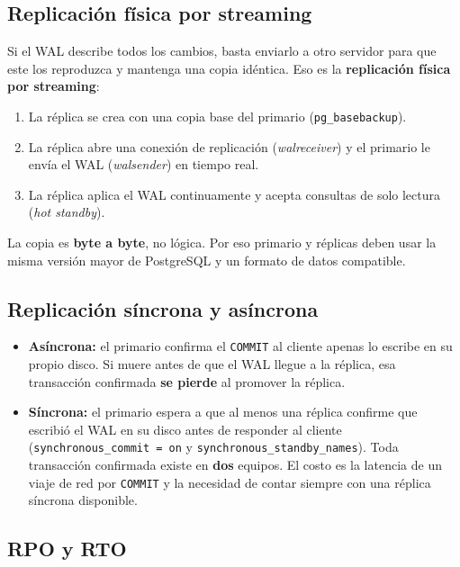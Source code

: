 \documentclass[11pt,a4paper]{article}
\newcommand{\cod}[1]{\texttt{#1}}
\begin{document}
\subsection{Replicación física por streaming}

Si el WAL describe todos los cambios, basta enviarlo a otro servidor para que este los reproduzca y mantenga una copia idéntica. Eso es la \textbf{replicación física por streaming}:

\begin{enumerate}
  \item La réplica se crea con una copia base del primario (\cod{pg\_basebackup}).
  \item La réplica abre una conexión de replicación (\emph{walreceiver}) y el primario le envía el WAL (\emph{walsender}) en tiempo real.
  \item La réplica aplica el WAL continuamente y acepta consultas de solo lectura (\emph{hot standby}).
\end{enumerate}

La copia es \textbf{byte a byte}, no lógica. Por eso primario y réplicas deben usar la misma versión mayor de PostgreSQL y un formato de datos compatible.

\subsection{Replicación síncrona y asíncrona}

\begin{itemize}
  \item \textbf{Asíncrona:} el primario confirma el \cod{COMMIT} al cliente apenas lo escribe en su propio disco. Si muere antes de que el WAL llegue a la réplica, esa transacción confirmada \textbf{se pierde} al promover la réplica.
  \item \textbf{Síncrona:} el primario espera a que al menos una réplica confirme que escribió el WAL en su disco antes de responder al cliente (\cod{synchronous\_commit = on} y \cod{synchronous\_standby\_names}). Toda transacción confirmada existe en \textbf{dos} equipos. El costo es la latencia de un viaje de red por \cod{COMMIT} y la necesidad de contar siempre con una réplica síncrona disponible.
\end{itemize}

\subsection{RPO y RTO}
\end{document}
